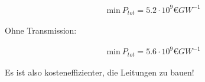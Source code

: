 \documentclass[11pt,a4paper,fleqn]{scrartcl}
\begin{document}
\begin{enumerate}[(a)]
 \begin{align*}
       \mathrm{min}\ P_{tot} = 5.2\cdot 10^9 \euro GW^{-1}
 \end{align*}
 
 Ohne Transmission:
 
 \begin{align*}
 \mathrm{min}\ P_{tot} = 5.6\cdot 10^9 \euro GW^{-1}
 \end{align*}
 
 Es ist also kosteneffizienter, die Leitungen zu bauen!
\end{enumerate}
\end{document}
